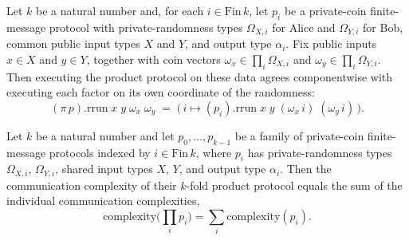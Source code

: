 \begin{theorem}
\label{CommunicationComplexity.PrivateCoin.FiniteMessage.Protocol.pi_rrun}
\leanok
{}
Let $k$ be a natural number and, for each $i \in \mathrm{Fin}\,k$, let $p_i$ be a
private-coin finite-message protocol with private-randomness types $\Omega_{X,i}$ for
Alice and $\Omega_{Y,i}$ for Bob, common public input types $X$ and $Y$, and output type
$\alpha_i$. Fix public inputs $x \in X$ and $y \in Y$, together with coin vectors
$\omega_x \in \prod_{i} \Omega_{X,i}$ and $\omega_y \in \prod_{i} \Omega_{Y,i}$. Then
executing the product protocol on these data agrees componentwise with executing each
factor on its own coordinate of the randomness:
\[
  (\pi\,p).\mathrm{rrun}\;x\;y\;\omega_x\;\omega_y
\;=\; \bigl(\, i \mapsto (p_i).\mathrm{rrun}\;x\;y\;(\omega_x\,i)\;(\omega_y\,i)
\,\bigr).
\]
\end{theorem}

\begin{theorem}
\label{CommunicationComplexity.PrivateCoin.FiniteMessage.Protocol.pi_complexity}
\leanok
{}
Let $k$ be a natural number and let $p_0, \dots, p_{k-1}$ be a family of private-coin
finite-message protocols indexed by $i \in \mathrm{Fin}\,k$, where $p_i$ has
private-randomness types $\Omega_{X,i}$, $\Omega_{Y,i}$, shared input types $X$, $Y$,
and output type $\alpha_i$. Then the communication complexity of their $k$-fold product
protocol equals the sum of the individual communication complexities, \[
\mathrm{complexity}\bigl(\textstyle\prod_{i} p_i\bigr) = \sum_{i}
\mathrm{complexity}(p_i). \]
\end{theorem}

